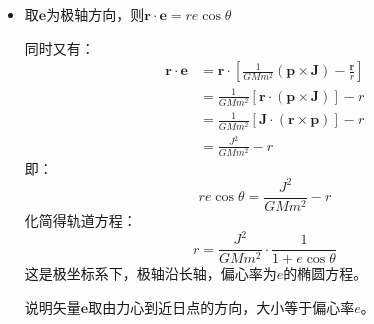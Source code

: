 \documentclass[a4paper,fontset=windows]{ctexart}
\begin{document}
\begin{itemize}
\begin{align*}
            &= -\frac{1}{GMm^2}\left(\frac{p_\theta^2\,\bm{\hat{r}}}{r^2}\right) \cdot \frac{p_r}{m} + \left[\frac{1}{GMm^2}\left(\frac{p_\theta^2\,\bm{\hat{\theta}}}{r} + p_r p_\theta\,\bm{\hat{r}}\right) - \bm{\hat{\theta}}\right] \cdot \frac{p_\theta}{mr^2} \\
            &\quad\, + \frac{p_\theta\,\bm{\hat{\theta}}}{GMm^2} \cdot \left(-\frac{p_\theta^2}{mr^3} + \frac{GMm}{r^2}\right) \\
            &= -\frac{1}{GMm^3}\cdot\frac{p_\theta p_r}{r^2}\,\bm{\hat{r}} + \frac{1}{GMm^3}\cdot\frac{p_\theta^3}{r^3}\,\bm{\hat{\theta}} + \frac{1}{GMm^3}\cdot\frac{p_\theta p_r}{r^2}\,\bm{\hat{r}} - \frac{p_\theta}{mr^2}\,\bm{\hat{\theta}} + \frac{p_\theta}{mr^2}\,\bm{\hat{\theta}} - \frac{1}{GMm^3}\cdot\frac{p_\theta^3}{r^3}\,\bm{\hat{\theta}} \\
            &= 0
        \end{align*}
        则$\bm{e}$守恒，为常矢量。
        \medskip

        \item[6.6.(2)]
        取$\bm{e}$为极轴方向，则$\bm{r} \cdot \bm{e} = re\cos\theta$

        同时又有：
        \begin{align*}
        \bm{r} \cdot \bm{e}
        &= \bm{r} \cdot \left[\frac{1}{GMm^2}(\bm{p} \times \bm{J}) - \frac{\bm{r}}{r}\right] \\
        &= \frac{1}{GMm^2}\left[\bm{r} \cdot (\bm{p} \times \bm{J})\right] - r \\
        &= \frac{1}{GMm^2}\left[\bm{J} \cdot (\bm{r} \times \bm{p})\right] - r \\
        &= \frac{J^2}{GMm^2} - r
        \end{align*}
        即：
        \[
        re\cos\theta = \frac{J^2}{GMm^2} - r
        \]
        化简得轨道方程：
        \[
        r = \frac{J^2}{GMm^2} \cdot \frac{1}{1+e\cos\theta}
        \]
        这是极坐标系下，极轴沿长轴，偏心率为$e$的椭圆方程。

        说明矢量$\bm{e}$取由力心到近日点的方向，大小等于偏心率$e$。
        \bigskip


\end{itemize}
\end{document}

